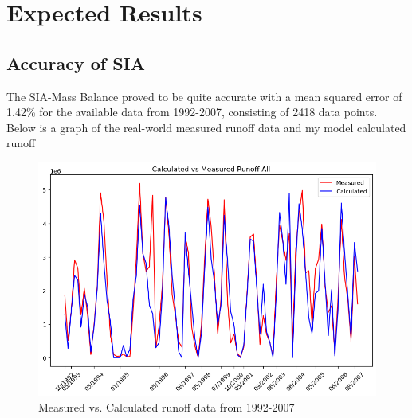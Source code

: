 \documentclass{article}
\begin{document}
\section{Expected Results}
\subsection{Accuracy of SIA}
The SIA-Mass Balance proved to be quite accurate with a mean squared error of 1.42\% for the available data from 1992-2007, consisting of 2418 
data points. Below is a graph of the real-world measured runoff data and my model calculated runoff
\begin{figure}[h!]
    \centering
    \includegraphics[width=\textwidth]{Plots/calc_vs_measured.png}
    \caption{Measured vs. Calculated runoff data from 1992-2007}
    \label{fig:calc_vs_measured}
\end{figure}
\FloatBarrier
\end{document}
